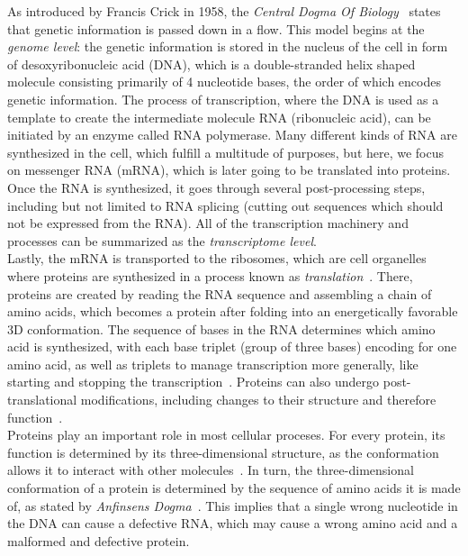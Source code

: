 As introduced by Francis Crick in 1958, the \emph{Central Dogma Of Biology}~\cite{crick_central_dogma} states that genetic information is passed down in a flow. This model begins at the \emph{genome level}: the genetic information is stored in the nucleus of the cell in form of desoxyribonucleic acid (DNA), which is a double-stranded helix shaped molecule consisting primarily of 4 nucleotide bases, the order of which encodes genetic information. The process of transcription, where the DNA is used as a template to create the intermediate molecule RNA (ribonucleic acid), can be initiated by an enzyme called RNA polymerase.
Many different kinds of RNA are synthesized in the cell, which fulfill a multitude of purposes, but here, we focus on messenger RNA (mRNA), which is later going to be translated into proteins. Once the RNA is synthesized, it goes through several post-processing steps\cite{molecular_cell_biology}, including but not limited to RNA splicing (cutting out sequences which should not be expressed from the RNA). All of the transcription machinery and processes can be summarized as the \emph{transcriptome level}.\\
Lastly, the mRNA is transported to the ribosomes, which are cell organelles where proteins are synthesized in a process known as \emph{translation}~\cite{molecular_cell_biology}. There, proteins are created by reading the RNA sequence and assembling a chain of amino acids, which becomes a protein after folding into an energetically favorable 3D conformation. The sequence of bases in the RNA determines which amino acid is synthesized, with each base triplet (group of three bases) encoding for one amino acid, as well as triplets to manage transcription more generally, like starting and stopping the transcription~\cite{spektrum_genetik}. Proteins can also undergo post-translational modifications, including changes to their structure and therefore function~\cite{molecular_cell_biology}.\\
Proteins play an important role in most cellular proceses.
For every protein, its function is determined by its three-dimensional structure, as the conformation allows it to interact with other molecules~\cite{molecular_biology_of_the_cell}. In turn, the three-dimensional conformation of a protein is determined by the sequence of amino acids it is made of, as stated by \emph{Anfinsens Dogma}~\cite{anfinsens_dogma}. This implies that a single wrong nucleotide in the DNA can cause a defective RNA, which may cause a wrong amino acid and a malformed and defective protein.\\
